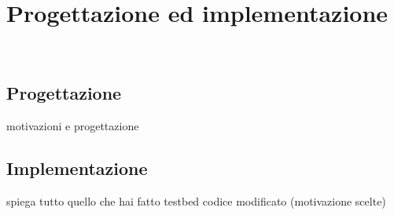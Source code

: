 \chapter{Progettazione ed implementazione}
\label{cap:progettazione}

\\

\section{Progettazione}
motivazioni e progettazione

\section{Implementazione}
spiega tutto quello che hai fatto testbed codice modificato (motivazione scelte)